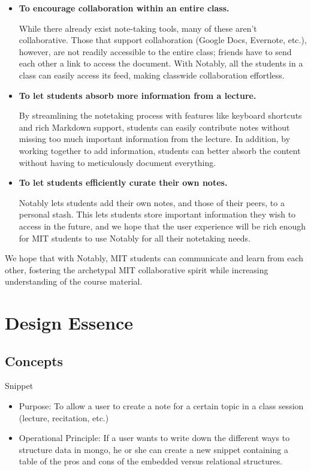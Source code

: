\documentclass{article}
\begin{document}
\begin{itemize}
\item  \textbf{To encourage collaboration within an entire class.}

While there already exist note-taking tools, many of these aren't collaborative. Those that support collaboration (Google Docs, Evernote, etc.), however, are not readily accessible to the entire class; friends have to send each other a link to access the document. With Notably, all the students in a class can easily access its feed, making classwide collaboration effortless.

\item \textbf{To let students absorb more information from a lecture.}

By streamlining the notetaking process with features like keyboard shortcuts and rich Markdown support, students can easily contribute notes without missing too much important information from the lecture. In addition, by working together to add information, students can better absorb the content without having to meticulously document everything.

\item \textbf{To let students efficiently curate their own notes.}

Notably lets students add their own notes, and those of their peers, to a personal stash. This lets students store important information they wish to access in the future, and we hope that the user experience will be rich enough for MIT students to use Notably for all their notetaking needs.

\end{itemize}

We hope that with Notably, MIT students can communicate and learn from each other, fostering the archetypal MIT collaborative spirit while increasing understanding of the course material.

\newpage

\section*{Design Essence}
\subsection*{Concepts}
Snippet
\begin{itemize}
\item Purpose: To allow a user to create a note for a certain topic in a class session (lecture, recitation, etc.)
\item Operational Principle: If a user wants to write down the different ways to structure data in mongo, he or she can create a new snippet containing a table of the pros and cons of the embedded versus relational structures.
\end{itemize}
\end{document}
